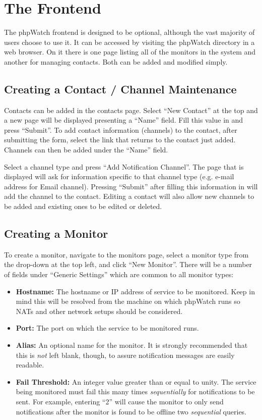 \documentclass[10pt]{article}
\begin{document}
\section{The Frontend}
The phpWatch frontend is designed to be optional, although the vast majority of users choose to use it.  It can be
accessed by visiting the phpWatch directory in a web browser.  On it there is one page listing all of the monitors in
the system and another for managing contacts.  Both can be added and modified simply.

\subsection{Creating a Contact / Channel Maintenance}
Contacts can be added in the contacts page.  Select ``New Contact'' at the top and a new page will be displayed
presenting a ``Name'' field.  Fill this value in and press ``Submit''.  To add contact information (channels) to the
contact, after submitting the form, select the link that returns to the contact just added.  Channels can then be added
under the ``Name'' field.

Select a channel type and press ``Add Notification Channel''.  The page that is displayed will ask for information
specific to that channel type (e.g. e-mail address for Email channel).  Pressing ``Submit'' after filling this
information in will add the channel to the contact.  Editing a contact will also allow new channels to be added and
existing ones to be edited or deleted.

\subsection{Creating a Monitor}
To create a monitor, navigate to the monitors page, select a monitor type from the drop-down at the top left, and click
``New Monitor''.  There will be a number of fields under ``Generic Settings'' which are common to all monitor types:

\begin{itemize}
    \item \textbf{Hostname:} The hostname or IP address of service to be monitored.  Keep in mind this will be resolved
    from the machine on which phpWatch runs so NATs and other network setups should be considered.
    \item \textbf{Port:} The port on which the service to be monitored runs.
    \item \textbf{Alias:} An optional name for the monitor.  It is strongly recommended that this is \emph{not} left
    blank, though, to assure notification messages are easily readable.
    \item \textbf{Fail Threshold:} An integer value greater than or equal to unity.  The service being monitored must
    fail this many times \emph{sequentially} for notifications to be sent.  For example, entering ``2'' will cause the
    monitor to only send notifications after the monitor is found to be offline two \emph{sequential} queries.
\end{itemize}
\end{document}
